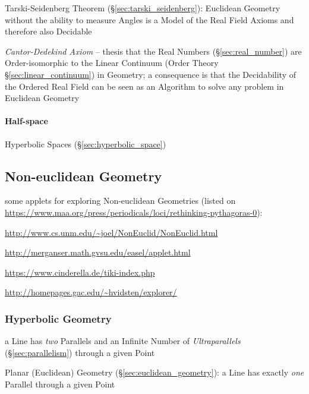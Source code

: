Tarski-Seidenberg Theorem (\S\ref{sec:tarski_seidenberg}): Euclidean Geometry
without the ability to measure Angles is a Model of the Real Field Axioms
and therefore also Decidable

\emph{Cantor-Dedekind Axiom} -- thesis that the Real Numbers
(\S\ref{sec:real_number}) are Order-isomorphic to the Linear Continuum (Order
Theory \S\ref{sec:linear_continuum}) in Geometry; a consequence is that the
Decidability of the Ordered Real Field can be seen as an Algorithm to solve any
problem in Euclidean Geometry



\paragraph{Half-space}\label{sec:half_space}\hfill

Hyperbolic Spaces (\S\ref{sec:hyperbolic_space})



\subsection{Non-euclidean Geometry}\label{sec:noneuclidean_geometry}

some applets for exploring Non-euclidean Geometries (listed on
\url{https://www.maa.org/press/periodicals/loci/rethinking-pythagoras-0}):

\url{http://www.cs.unm.edu/~joel/NonEuclid/NonEuclid.html}

\url{http://merganser.math.gvsu.edu/easel/applet.html}

\url{https://www.cinderella.de/tiki-index.php}

\url{http://homepages.gac.edu/~hvidsten/explorer/}



\subsubsection{Hyperbolic Geometry}\label{sec:hyperbolic_geometry}

a Line has \emph{two} Parallels and an Infinite Number of \emph{Ultraparallels}
(\S\ref{sec:parallelism}) through a given Point

\fist Planar (Euclidean) Geometry (\S\ref{sec:euclidean_geometry}): a Line has
  exactly \emph{one} Parallel through a given Point

